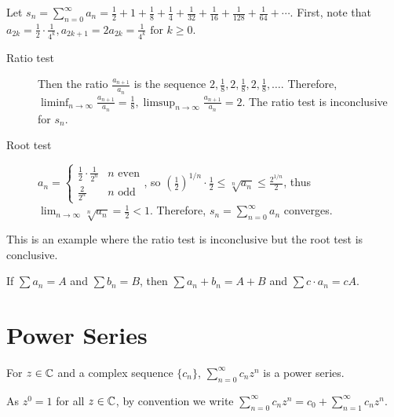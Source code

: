 \begin{example}
	\label{ex:3.35b}
	Let $s_{n}=\sum_{n=0}^{\infty}{a_{n}}=\frac{1}{2}+1+\frac{1}{8}+\frac{1}{4}+\frac{1}{32}+\frac{1}{16}+\frac{1}{128}+\frac{1}{64}+ \cdots$.
	First, note that $a_{2k}=\frac{1}{2}\cdot\frac{1}{4^{k}}, a_{2k+1}=2a_{2k}=\frac{1}{4^{k}} \text{ for } k \ge 0$.
	\begin{description}
		\item[Ratio test]
		      Then the ratio $\frac{a_{n+1}}{a_n}$ is the sequence $2, \frac{1}{8}, 2, \frac{1}{8},2, \frac{1}{8}, \ldots $. Therefore, $\liminf_{n\to \infty}{\frac{a_{n+1}}{a_{n}}}=\frac{1}{8}, \limsup_{n\to \infty}{\frac{a_{n+1}}{a_{n}}}=2$.
		      The ratio test is inconclusive for $s_{n}$.
		\item[Root test]
		      $a_{n}= \begin{cases}
				      \frac{1}{2} \cdot \frac{1}{2^{n}} & n \text{ even} \\
				      \frac{2}{2^{n}}                   & n \text{ odd}
			      \end{cases}
		      $, so $(\frac{1}{2})^{1/n}\cdot \frac{1}{2} \le  \sqrt[n]{a_{n}}\le \frac{2^{1/n}}{2}$, thus $\lim_{n\to \infty}{\sqrt[n]{a_{n}}}=\frac{1}{2}<1$. Therefore, $s_{n}=\sum_{n=0}^{\infty}{a_{n}}$ converges.
	\end{description}
	This is an example where the ratio test is inconclusive but the root test is conclusive.
\end{example}

\begin{theorem}
	\label{thm:3.47}
	If $\sum{a_{n}}=A$ and $\sum{b_{n}}=B$, then $\sum{a_{n} + b_{n}}=A+B$ and $\sum{c \cdot a_{n}}=c  A$.
\end{theorem}

\section{Power Series}
\begin{definition}
	\label{def:3.38}
	For $z \in \mathbb{C}$ and a complex sequence $\{ {c}_{n}\}$, $\sum_{n=0}^{\infty}{c_{n}z^{n}}$ is a power series.
	\begin{remark}
		As $z^{0}=1$ for all $z \in \mathbb{C}$, by convention we write $\sum_{n=0}^{\infty}{c_{n}z^{n}}=c_0+\sum_{n=1}^{\infty}{c_{n}z^{n}}$.
	\end{remark}
\end{definition}

